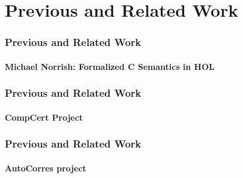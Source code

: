 \section{Previous and Related Work}


\begin{frame}
\frametitle{Previous and Related Work}
\framesubtitle{Michael Norrish: Formalized C Semantics in HOL}


\end{frame}


\begin{frame}
\frametitle{Previous and Related Work}
\framesubtitle{CompCert Project}


\end{frame}


\begin{frame}
\frametitle{Previous and Related Work}
\framesubtitle{AutoCorres project}


\end{frame}
